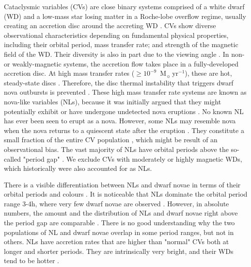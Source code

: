 \documentclass[fleqn,usenatbib]{mnras}
\def\msun{M$_{\odot}$}
\def\msun{M$_{\sun}$}
\begin{document}
Cataclysmic variables (CVs) are close binary systems comprised of a white dwarf (WD) and a low-mass star losing matter in a  Roche-lobe
overflow regime, usually creating an accretion disc around the accreting WD \citep{1995CAS....28.....W}. CVs show diverse observational
characteristics depending on fundamental physical properties, including their orbital period,  mass transfer rate; and strength of the
magnetic field of the WD. Their diversity is also in part due to the viewing angle \citep{2018AJ....156..198H}.  In non- or weakly-magnetic
systems, the accretion flow takes place in a fully-developed accretion disc.  At high mass transfer rates ($\ge 10^{-9}$~\msun\,yr$^{-1}$),
these are hot, steady-state discs  \citep{1996MNRAS.282...99B}. Therefore,  the disc thermal instability that triggers dwarf nova outbursts 
is prevented \citep{1986ApJ...305..261S,1992ApJ...394..268S,2001NewAR..45..449L}. These high mass transfer rate systems are known as 
nova-like variables (NLs), because it was initially argued that they might potentially exhibit or have undergone undetected nova eruptions
\citep{1934Obs....57..157V}. No known NL has ever been seen to erupt as a nova.  However, some NLs may resemble  nova when the nova returns to a quiescent state after the eruption \citep{1995CAS....28.....W}. They constitute a small fraction of the entire CV
population \citep[$\sim$15\ percent  in][]{2003yCat.5113....0R, 2003A&A...404..301R},
which might be result of an observational bias. The vast majority of NLs have orbital periods  above the so-called "period gap"
\citep{1983ApJ...275..713R,1998MNRAS.298L..29K,2016MNRAS.457.3867Z,2020MNRAS.492L..40A}. We exclude  CVs with moderately or highly magnetic WDs, which historically were also accounted for as NLs.  

There is a visible differentiation between NLs and  dwarf novae in terms of their orbital periods and colours \citep{2020MNRAS.492L..40A}. 
It is noticeable that NLs dominate the orbital period range 3-4h, where very few dwarf novae are observed \citep{2011ApJS..194...28K}.
However, in absolute numbers, the amount and the distribution of NLs and dwarf novae right above the period gap are comparable
\citep{2011ApJS..194...28K}. There is no good understanding why the two populations of NL and dwarf novae overlap in some period ranges, 
but not in others. NLs have accretion rates that are higher than "normal" CVs both at longer and shorter periods. They are intrinsically
very bright, and their WDs  tend to be hotter \citep{2009ApJ...693.1007T}. 
\end{document}
